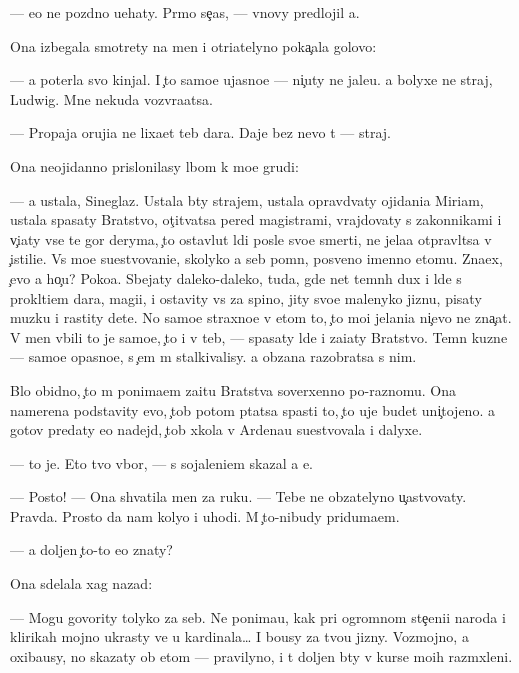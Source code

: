 \documentclass[10pt]{book}
\begin{document}
— {\y}e{\x}o ne pozdno u{\y}ehaty. Pr{\ia}mo se{\y}{\c}as, — vnovy predlojil {\y}a.

Ona izbegala smotrety na men{\ia} i otri{\q}atelyno poka{\c}ala golovo{\y}:

— {\Y}a poter{\ia}la svo{\y} kinjal. I {\c}to samo{\y}e ujasno{\y}e — ni{\c}uty ne jale{\y}u. {\Y}a bolyxe ne straj, Ludwig. Mne nekuda vozvra{\x}atsa.

— Propaja oruji{\y}a ne lixa{\y}et teb{\ia} dara. Daje bez nevo t{\yi} — straj.

Ona neojidanno prislonilasy lbom k mo{\y}e{\y} grudi:

— {\Y}a ustala, Sineglaz{\yi}{\y}. Ustala b{\yi}ty strajem, ustala opravd{\yi}vaty ojidani{\y}a Miriam, ustala spasaty Bratstvo, ot{\c}it{\yi}vatsa pered magistrami, vrajdovaty s zakonnikami i v{\yi}{\c}i{\x}aty vse te gor{\yi} deryma, {\c}to ostavl{\ia}{\y}ut l{\iu}di posle svo{\y}e{\y} smerti, ne jela{\y}a otpravl{\ia}tsa v {\c}istili{\x}e. Vs{\e} mo{\y}e su{\x}estvovani{\y}e, skolyko {\y}a seb{\ia} pomn{\iu}, posv{\ia}{\x}eno imenno etomu. Zna{\y}ex, {\c}evo {\y}a ho{\c}u? Poko{\y}a. Sbejaty daleko-daleko, tuda, gde net temn{\yi}h dux i l{\iu}de{\y} s prokl{\ia}ti{\y}em dara, magi{\y}i, i ostavity vs{\e} za spino{\y}, jity svo{\y}e{\y} malenyko{\y} jizn{\y}u, pisaty muz{\yi}ku i rastity dete{\y}. No samo{\y}e straxno{\y}e v etom to, {\c}to mo{\y}i jelani{\y}a ni{\c}evo ne zna{\c}at. V men{\ia} vbili to je samo{\y}e, {\c}to i v teb{\ia}, — spasaty l{\iu}de{\y} i za{\x}i{\x}aty Bratstvo. Temn{\yi}{\y} kuzne{\q} — samo{\y}e opasno{\y}e, s {\c}em m{\yi} stalkivalisy. {\Y}a ob{\ia}zana razobratsa s nim.

B{\yi}lo obidno, {\c}to m{\yi} ponima{\y}em za{\x}itu Bratstva soverxenno po-raznomu. Ona namerena podstavity {\y}evo, {\c}tob{\yi} potom p{\yi}tatsa spasti to, {\c}to uje budet uni{\c}tojeno. {\Y}a gotov predaty {\y}e{\y}o nadejd{\yi}, {\c}tob{\yi} xkola v Ardenau su{\x}estvovala i dalyxe.

— {\C}to je. Eto tvo{\y} v{\yi}bor, — s sojaleni{\y}em skazal {\y}a {\y}e{\y}.

— Posto{\y}! — Ona shvatila men{\ia} za ruku. — Tebe ne ob{\ia}zatelyno u{\c}astvovaty. Pravda. Prosto da{\y} nam koly{\q}o i uhodi. M{\yi} {\c}to-nibudy priduma{\y}em.

— {\Y}a doljen {\c}to-to {\y}e{\x}o znaty?

Ona sdelala xag nazad:

— Mogu govority tolyko za seb{\ia}. Ne ponima{\y}u, kak pri ogromnom ste{\c}eni{\y}i naroda i klirikah mojno ukrasty ve{\x} u kardinala… I bo{\y}usy za tvo{\y}u jizny. Vozmojno, {\y}a oxiba{\y}usy, no skazaty ob etom — pravilyno, i t{\yi} doljen b{\yi}ty v kurse mo{\y}ih razm{\yi}xleni{\y}.
\end{document}
